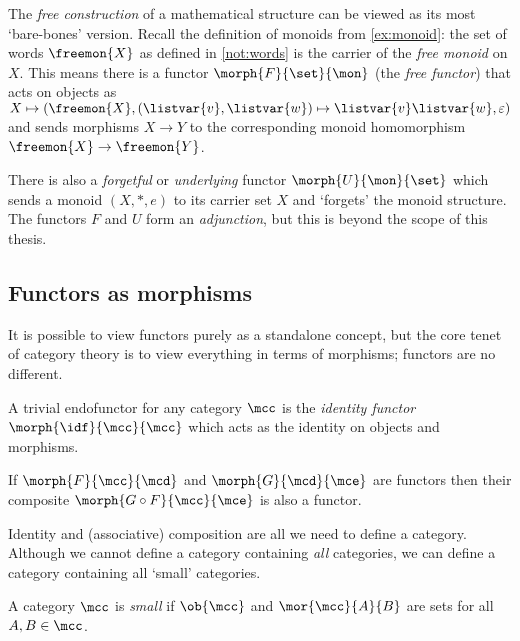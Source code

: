 \begin{example}\label{ex:free-monoid}
    The \emph{free construction} of a mathematical structure can be viewed as
    its most `bare-bones' version.
    Recall the definition of monoids from \cref{ex:monoid}: the set of words
    \(\freemon{X}\) as defined in \cref{not:words} is the carrier of the
    \emph{free monoid} on \(X\).
    This means there is a functor \(\morph{F}{\set}{\mon}\) (the
    \emph{free functor}) that acts on objects as \(
    X \mapsto (
    \freemon{X},
    (\listvar{v}, \listvar{w}) \mapsto \listvar{v}\listvar{w},
    \varepsilon
    )\) and sends morphisms \(X \to Y\) to the corresponding monoid homomorphism
    \(\freemon{X} \to \freemon{Y}\).

    There is also a \emph{forgetful} or \emph{underlying} functor
    \(\morph{U}{\mon}{\set}\) which sends a monoid \((X, *, e)\) to its carrier
    set \(X\) and `forgets' the monoid structure.
    The functors \(F\) and \(U\) form an \emph{adjunction}, but this
    is beyond the scope of this thesis.
\end{example}

\subsection{Functors as morphisms}

It is possible to view functors purely as a standalone concept, but the
core tenet of category theory is to view everything in terms of morphisms;
functors are no different.

\begin{example}
    A trivial endofunctor for any category \(\mcc\) is the
    \emph{identity functor} \(\morph{\idf}{\mcc}{\mcc}\) which acts as the
    identity on objects and morphisms.
\end{example}

\begin{example}
    If \(\morph{F}{\mcc}{\mcd}\) and \(\morph{G}{\mcd}{\mce}\) are functors
    then their composite \(\morph{G \circ F}{\mcc}{\mce}\) is also a functor.
\end{example}

Identity and (associative) composition are all we need to define a category.
Although we cannot define a category containing \emph{all} categories, we can
define a category containing all `small' categories.

\begin{definition}
    A category \(\mcc\) is \emph{small} if \(\ob{\mcc}\) and
    \(\mor{\mcc}{A}{B}\) are sets for all \(A, B \in \mcc\).
\end{definition}

